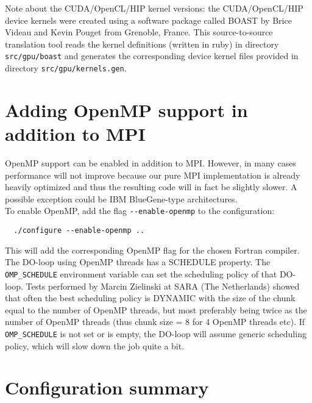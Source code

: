 Note about the CUDA/OpenCL/HIP kernel versions: the CUDA/OpenCL/HIP device kernels were
created using a software package called BOAST \citep{Videau2013} by Brice Videau and Kevin Pouget from Grenoble, France.
This source-to-source translation tool reads the kernel definitions (written in ruby) in directory \texttt{src/gpu/boast}
and generates the corresponding device kernel files provided in directory \texttt{src/gpu/kernels.gen}.


\section{Adding OpenMP support in addition to MPI}

OpenMP support can be enabled in addition to MPI. However, in many
cases performance will not improve because our pure MPI implementation
is already heavily optimized and thus the resulting code will in fact
be slightly slower. A possible exception could be IBM BlueGene-type
architectures.\\

\noindent
To enable OpenMP,  add the flag \texttt{-{}-enable-openmp} to the configuration:
{\small
\begin{verbatim}
  ./configure --enable-openmp ..
\end{verbatim}
}
\noindent
This will add the corresponding OpenMP flag for the chosen Fortran compiler.\\


The DO-loop using OpenMP threads has a SCHEDULE property. The \texttt{OMP\_SCHEDULE}
environment variable can set the scheduling policy of that DO-loop.
Tests performed by Marcin Zielinski at SARA (The Netherlands) showed
that often the best scheduling policy is DYNAMIC with the size of
the chunk equal to the number of OpenMP threads, but most preferably
being twice as the number of OpenMP threads (thus chunk size = 8 for
4 OpenMP threads etc). If \texttt{OMP\_SCHEDULE} is not set or is empty, the
DO-loop will assume generic scheduling policy, which will slow down
the job quite a bit.


\section{Configuration summary}

